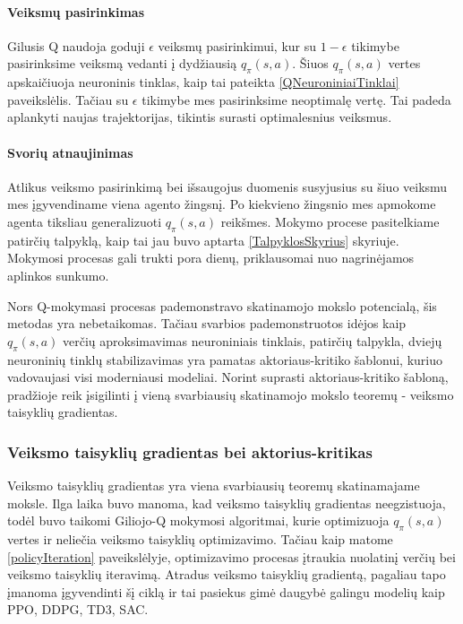 \documentclass[a4paper, 12pt]{article}
\begin{document}
\paragraph{Veiksmų pasirinkimas}

Gilusis Q naudoja goduji $\epsilon$ veiksmų pasirinkimui, kur su $1-\epsilon$ tikimybe pasirinksime veiksmą vedanti į dydžiausią $q_{\pi}(s, a)$. Šiuos $q_{\pi}(s, a)$ vertes apskaičiuoja neuroninis tinklas, kaip tai pateikta \ref{QNeuroniniaiTinklai} paveikslėlis. Tačiau su $\epsilon$ tikimybe mes pasirinksime neoptimalę vertę. Tai padeda aplankyti naujas trajektorijas, tikintis surasti optimalesnius veiksmus.

\paragraph{Svorių atnaujinimas}

Atlikus veiksmo pasirinkimą bei išsaugojus duomenis susyjusius su šiuo veiksmu mes įgyvendiname viena agento žingsnį. Po kiekvieno žingsnio mes apmokome agenta tiksliau generalizuoti $q_{\pi}(s, a)$ reikšmes. Mokymo procese pasitelkiame patirčių talpyklą, kaip tai jau buvo aptarta \ref{TalpyklosSkyrius} skyriuje. Mokymosi procesas gali trukti pora dienų, priklausomai nuo nagrinėjamos aplinkos sunkumo.

Nors Q-mokymasi procesas pademonstravo skatinamojo mokslo potencialą, šis metodas yra nebetaikomas. Tačiau svarbios pademonstruotos idėjos kaip  $q_{\pi}(s, a)$ verčių aproksimavimas neuroniniais tinklais, patirčių talpykla, dviejų neuroninių tinklų stabilizavimas yra pamatas aktoriaus-kritiko šablonui, kuriuo vadovaujasi visi moderniausi modeliai. Norint suprasti aktoriaus-kritiko šabloną, pradžioje reik įsigilinti į vieną svarbiausių skatinamojo mokslo teoremų - veiksmo taisyklių gradientas.


\subsubsection{Veiksmo taisyklių gradientas bei aktorius-kritikas}

Veiksmo taisyklių gradientas yra viena svarbiausių teoremų skatinamajame moksle. Ilga laika buvo manoma, kad veiksmo taisyklių gradientas neegzistuoja, todėl buvo taikomi Giliojo-Q mokymosi algoritmai, kurie optimizuoja $q_{\pi}(s, a)$ vertes ir neliečia veiksmo taisyklių optimizavimo. Tačiau kaip matome \ref{policyIteration} paveikslėlyje, optimizavimo procesas įtraukia nuolatinį verčių bei veiksmo taisyklių iteravimą. Atradus veiksmo taisyklių gradientą, pagaliau tapo įmanoma įgyvendinti šį ciklą ir tai pasiekus gimė daugybė galingu modelių kaip PPO, DDPG, TD3, SAC. 
\end{document}

